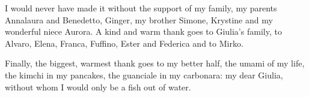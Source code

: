 \medskip

I would never have made it without the support of my family, my parents Annalaura and Benedetto, Ginger, my brother Simone, Krystine and my wonderful niece Aurora. A kind and warm thank goes to Giulia's family, to Alvaro, Elena, Franca, Fuffino, Ester and Federica and to Mirko.

\medskip

Finally, the biggest, warmest thank goes to my better half, the umami of my life, the kimchi in my pancakes, the guanciale in my carbonara: my dear Giulia, without whom I would only be a fish out of water.

